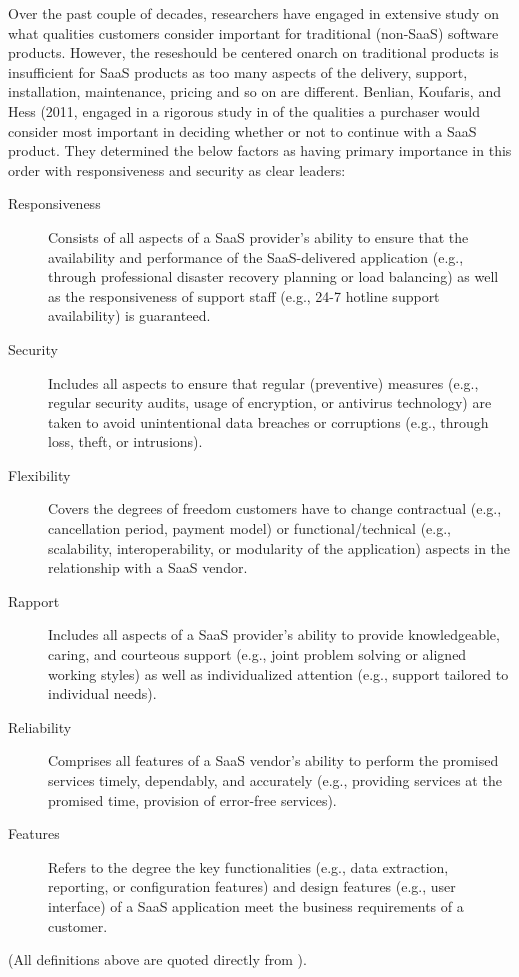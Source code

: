 \documentclass[10pt]{article}
\begin{document}
Over the past couple of decades, researchers have engaged in extensive study on what qualities customers consider important for traditional (non-SaaS) software products.
However, the reseshould be centered onarch on traditional products is insufficient for SaaS products as too many aspects of the delivery, support, installation, maintenance, pricing and so on are different.
Benlian, Koufaris, and Hess (2011, \cite{saasqual} engaged in a rigorous study in \cite{saasqual} of the qualities a purchaser would consider most important in deciding whether or not to continue with a SaaS product.
They determined the below factors as having primary importance in this order with responsiveness and security as clear leaders:
\begin{description}
	\item[Responsiveness]
	Consists of all aspects of a SaaS provider’s ability to ensure that the availability and performance of the SaaS-delivered application (e.g., through professional disaster recovery planning or load balancing) as well as the responsiveness of support staff (e.g., 24-7 hotline support availability) is guaranteed.
	\item[Security]
	Includes all aspects to ensure that regular (preventive) measures (e.g., regular security audits, usage of encryption, or antivirus technology) are taken to avoid unintentional data breaches or corruptions (e.g., through loss, theft, or intrusions).
	\item[Flexibility]
	Covers the degrees of freedom customers have to change contractual (e.g., cancellation period, payment model) or functional/technical (e.g., scalability, interoperability, or modularity of the application) aspects in the relationship with a SaaS vendor.
	\item[Rapport]
	Includes all aspects of a SaaS provider’s ability to provide knowledgeable, caring, and courteous support (e.g., joint problem solving or aligned working styles) as well as individualized attention (e.g., support tailored to individual needs).
	\item[Reliability]
	Comprises all features of a SaaS vendor’s ability to perform the promised services timely, dependably, and accurately (e.g., providing services at the promised time, provision of error-free services).
	\item[Features]
	Refers to the degree the key functionalities (e.g., data extraction, reporting, or configuration features) and design features (e.g., user interface) of a SaaS application meet the business requirements of a customer.
\end{description}
(All definitions above are quoted directly from \cite{saasqual}).
\end{document}
